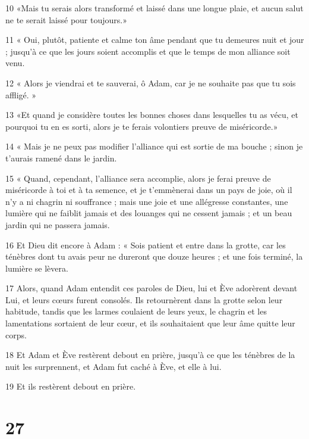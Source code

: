 \par 10 «Mais tu serais alors transformé et laissé dans une longue plaie, et aucun salut ne te serait laissé pour toujours.»

\par 11 « Oui, plutôt, patiente et calme ton âme pendant que tu demeures nuit et jour ; jusqu'à ce que les jours soient accomplis et que le temps de mon alliance soit venu.

\par 12 « Alors je viendrai et te sauverai, ô Adam, car je ne souhaite pas que tu sois affligé. »

\par 13 «Et quand je considère toutes les bonnes choses dans lesquelles tu as vécu, et pourquoi tu en es sorti, alors je te ferais volontiers preuve de miséricorde.»

\par 14 « Mais je ne peux pas modifier l'alliance qui est sortie de ma bouche ; sinon je t'aurais ramené dans le jardin.

\par 15 « Quand, cependant, l'alliance sera accomplie, alors je ferai preuve de miséricorde à toi et à ta semence, et je t'emmènerai dans un pays de joie, où il n'y a ni chagrin ni souffrance ; mais une joie et une allégresse constantes, une lumière qui ne faiblit jamais et des louanges qui ne cessent jamais ; et un beau jardin qui ne passera jamais.

\par 16 Et Dieu dit encore à Adam : « Sois patient et entre dans la grotte, car les ténèbres dont tu avais peur ne dureront que douze heures ; et une fois terminé, la lumière se lèvera.

\par 17 Alors, quand Adam entendit ces paroles de Dieu, lui et Ève adorèrent devant Lui, et leurs cœurs furent consolés. Ils retournèrent dans la grotte selon leur habitude, tandis que les larmes coulaient de leurs yeux, le chagrin et les lamentations sortaient de leur cœur, et ils souhaitaient que leur âme quitte leur corps.

\par 18 Et Adam et Ève restèrent debout en prière, jusqu'à ce que les ténèbres de la nuit les surprennent, et Adam fut caché à Ève, et elle à lui.

\par 19 Et ils restèrent debout en prière.

\chapter{27}

